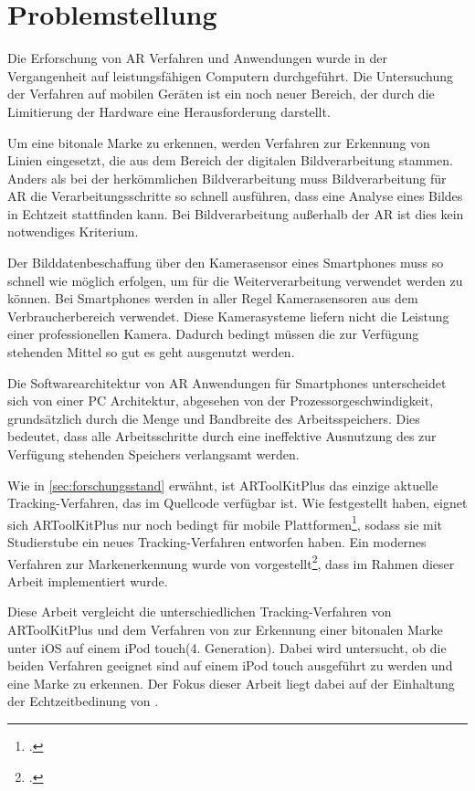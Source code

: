 \section{Problemstellung} %
\label{sec:problemstellung}
\begin{comment}
	Problemstellung: Problemstellung und Frage im Detail erläutern
\end{comment}

Die Erforschung von \gls{AR} Verfahren und Anwendungen wurde in der Vergangenheit auf leistungsfähigen Computern
 durchgeführt. Die Untersuchung der Verfahren auf mobilen Geräten ist ein noch neuer Bereich, der durch die Limitierung
 der Hardware eine Herausforderung darstellt.

Um eine bitonale Marke zu erkennen, werden Verfahren zur Erkennung von Linien eingesetzt, die aus dem Bereich der
 digitalen Bildverarbeitung stammen. Anders als bei der herkömmlichen Bildverarbeitung muss Bildverarbeitung für
 \gls{AR} die Verarbeitungsschritte so schnell ausführen, dass eine Analyse eines Bildes in Echtzeit stattfinden kann.
 Bei Bildverarbeitung außerhalb der \gls{AR} ist dies kein notwendiges Kriterium.

Der Bilddatenbeschaffung über den Kamerasensor eines Smartphones muss so schnell wie möglich erfolgen, um für die
 Weiterverarbeitung verwendet werden zu können. Bei Smartphones werden in aller Regel Kamerasensoren aus dem
 Verbraucherbereich verwendet. Diese Kamerasysteme liefern nicht die Leistung einer professionellen Kamera. Dadurch
 bedingt müssen die zur Verfügung stehenden Mittel so gut es geht ausgenutzt werden.

Die Softwarearchitektur von \gls{AR} Anwendungen für Smartphones unterscheidet sich von einer PC Architektur, abgesehen
 von der Prozessorgeschwindigkeit, grundsätzlich durch die Menge und Bandbreite des Arbeitsspeichers. Dies bedeutet,
 dass alle Arbeitsschritte durch eine ineffektive Ausnutzung des zur Verfügung stehenden Speichers verlangsamt werden.

Wie in \autoref{sec:forschungsstand} erwähnt, ist ARToolKitPlus das einzige aktuelle Tracking-Verfahren, das im
 Quellcode verfügbar ist. Wie \citeauthor{wagner09a} festgestellt haben, eignet sich ARToolKitPlus nur noch bedingt für
 mobile Plattformen\footcite{wagner09a}, sodass sie mit Studierstube ein neues Tracking-Verfahren entworfen haben. Ein
 modernes Verfahren zur Markenerkennung wurde von \citeauthor{hirzer08} vorgestellt\footcite{hirzer08}, dass im Rahmen
 dieser Arbeit implementiert wurde.

Diese Arbeit vergleicht die unterschiedlichen Tracking-Verfahren von ARToolKitPlus und dem Verfahren von
 \citeauthor{hirzer08} zur Erkennung einer bitonalen Marke unter iOS auf einem iPod
 touch\textregistered (4. Generation). Dabei wird untersucht, ob die beiden Verfahren geeignet sind auf einem iPod
 touch ausgeführt zu werden und eine Marke zu erkennen. Der Fokus dieser Arbeit liegt dabei auf der Einhaltung der
 Echtzeitbedinung von \citeauthor{azuma97}.

